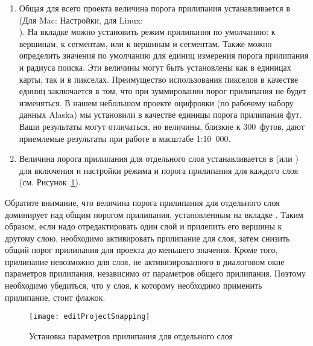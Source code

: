 \begin{enumerate}
\item Общая для всего проекта величина порога прилипания устанавливается в
 \arrow {}
(Для Mac: \mainmenuopt{\qg} \arrow Настройки, для Linux: 
\arrow \\ ).
На вкладке  можно установить режим прилипания по
умолчанию: к вершинам, к сегментам, или к вершинам и сегментам. Также можно определить
значения по умолчанию для единиц измерения порога прилипания и радиуса поиска.
Эти величины  могут быть установлены как в единицах карты, так и в пикселах.
Преимущество использования пикселов в качестве единиц заключается в том, что
при зуммировании порог прилипания не будет изменяться.
В нашем небольшом проекте оцифровки (по рабочему набору данных Alaska) мы
установили в качестве единицы порога прилипания фут. Ваши результаты могут
отличаться, но величины, близкие к 300~футов, дают приемлемые
результаты при работе в масштабе 1:10~000.
\item Величина порога прилипания для отдельного слоя устанавливается в
 (или ) \arrow
{} для включения и настройки режима и
порога прилипания для каждого слоя (см. Рисунок~\ref{fig:snappingoptions}).
\end{enumerate}

Обратите внимание, что величина порога прилипания для отдельного слоя
доминирует над общим порогом прилипания, установленным на вкладке .
Таким образом, если надо отредактировать один слой и прилепить его вершины
к другому слою, необходимо активировать прилипание 
для слоя, затем снизить общий порог прилипания для проекта до меньшего
значения. Кроме того, прилипание невозможно для слоя, не активизированного
в диалоговом окне параметров прилипания, независимо от параметров
общего прилипания. Поэтому необходимо убедиться, что у слоя, к которому
необходимо применить прилипание, стоит флажок.

\begin{figure}[ht]
   \centering
   \texttt{[image: editProjectSnapping]}
   \caption{Установка параметров прилипания для отдельного слоя \wincaption}\label{fig:snappingoptions}
\end{figure}


